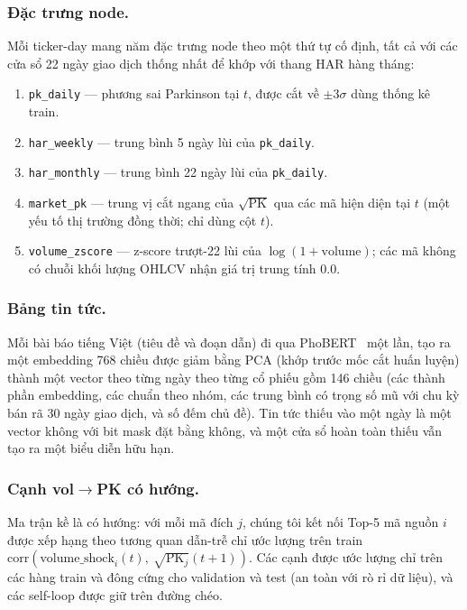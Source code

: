 \documentclass[runningheads]{llncs}
\begin{document}
\subsubsection{Đặc trưng node.}
Mỗi ticker-day mang năm đặc trưng node theo một thứ tự cố định, tất cả với các cửa sổ 22 ngày giao dịch
thống nhất để khớp với thang HAR hàng tháng:
\begin{enumerate}
\item \texttt{pk\_daily} --- phương sai Parkinson tại $t$, được cắt về $\pm 3\sigma$ dùng thống kê train.
\item \texttt{har\_weekly} --- trung bình 5 ngày lùi của \texttt{pk\_daily}.
\item \texttt{har\_monthly} --- trung bình 22 ngày lùi của \texttt{pk\_daily}.
\item \texttt{market\_pk} --- trung vị cắt ngang của $\sqrt{\text{PK}}$ qua các mã hiện diện tại $t$ (một
yếu tố thị trường đồng thời; chỉ dùng cột $t$).
\item \texttt{volume\_zscore} --- z-score trượt-22 lùi của $\log(1+\text{volume})$; các mã không có chuỗi
khối lượng OHLCV nhận giá trị trung tính 0.0.
\end{enumerate}

\subsubsection{Bảng tin tức.}
Mỗi bài báo tiếng Việt (tiêu đề và đoạn dẫn) đi qua PhoBERT~\cite{phobert2020} một lần, tạo ra một
embedding 768 chiều được giảm bằng PCA (khớp trước mốc cắt huấn luyện) thành một vector theo từng ngày
theo từng cổ phiếu gồm 146 chiều (các thành phần embedding, các chuẩn theo nhóm, các trung bình có trọng
số mũ với chu kỳ bán rã 30 ngày giao dịch, và số đếm chủ đề). Tin tức thiếu vào một ngày là một vector
không với bit mask đặt bằng không, và một cửa sổ hoàn toàn thiếu vẫn tạo ra một biểu diễn hữu hạn.

\subsubsection{Cạnh vol$\to$PK có hướng.}
Ma trận kề là có hướng: với mỗi mã đích $j$, chúng tôi kết nối Top-5 mã nguồn $i$ được xếp hạng theo
tương quan dẫn-trễ chỉ ước lượng trên train
$\text{corr}(\text{volume\_shock}_i(t),\ \sqrt{\text{PK}_j}(t{+}1))$. Các cạnh được ước lượng chỉ trên
các hàng train và đông cứng cho validation và test (an toàn với rò rỉ dữ liệu), và các self-loop được
giữ trên đường chéo.
\end{document}
